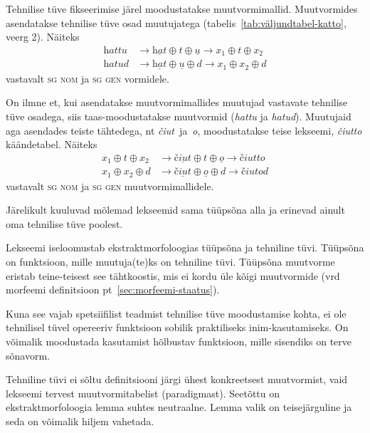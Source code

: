 \documentclass[12pt,a4paper]{article}
\newcommand{\vadja}[1]{\textit{#1}}
\newcommand{\msd}[1]{\textsc{#1}}
\begin{document}
Tehnilise tüve fikseerimise järel moodustatakse muutvormi\-mallid. Muutvormides asendatakse tehnilise tüve osad muutujatega (tabelis~\ref{tab:väljundtabel-katto}, veerg 2). Näiteks
\begin{align*}
  \textit{hattu} &\rightarrow \underline{\textit{hat}} \oplus \textit{t} \oplus \underline{\textit{u}} \rightarrow x_1 \oplus t \oplus x_2 \nonumber \\
  \textit{hatud} &\rightarrow \underline{\textit{hat}} \oplus \underline{\textit{u}} \oplus \textit{d} \rightarrow x_1 \oplus x_2 \oplus d \nonumber
\end{align*}
vastavalt \msd{sg nom} ja \msd{sg gen} vormidele.

On ilmne et, kui asendatakse muutvormimallides muutujad vastavate tehnilise tüve osadega, siis taas-moodustatakse muutvormid (\vadja{hattu} ja \vadja{hatud}). Muutujaid aga asendades teiste tähtedega, %
nt \textit{čiut}~ja~\textit{o}, moodustatakse teise lekseemi, \vadja{čiutto} käändetabel. Näiteks
\begin{align*}
  x_1 \oplus t \oplus x_2 &\rightarrow \underline{\textit{čiut}} \oplus \textit{t} \oplus \underline{\textit{o}} \rightarrow \textit{čiutto} \nonumber \\
  x_1 \oplus x_2 \oplus d &\rightarrow \underline{\textit{čiut}} \oplus \underline{\textit{o}} \oplus \textit{d} \rightarrow \textit{čiutod} \nonumber
\end{align*}
vastavalt \msd{sg nom} ja \msd{sg gen} muutvormi\-mallidele.

Järelikult kuuluvad mõlemad lekseemid sama tüüpsõna alla ja erinevad ainult oma tehnilise tüve poolest.

Lekseemi iseloomustab ekstraktmorfoloogias tüüpsõna ja tehniline tüvi. Tüüpsõna on funktsioon, mille muutuja(te)ks on tehniline tüvi. Tüüpsõna muutvorme eristab teine-teisest see tähtkoostis, mis ei kordu üle kõigi muutvormide (vrd morfeemi definitsioon pt~\ref{sec:morfeemi-staatus}).

Kuna see vajab spetsiifilist teadmist tehnilise tüve moodustamise kohta, ei ole tehnilisel tüvel opereeriv funktsioon sobilik praktiliseks inim-kasutamiseks. On võimalik moodustada kasutamist hõlbustav funktsioon, mille sisendiks on terve sõnavorm.

Tehniline tüvi ei sõltu definitsiooni järgi ühest konkreetsest muutvormist, vaid lekseemi tervest muutvormi\-tabelist (paradigmast). Seetõttu on ekstrakt\-morfoloogia lemma suhtes neutraalne. Lemma valik on teise\-järguline ja seda on võimalik hiljem vahetada. %
\end{document}
